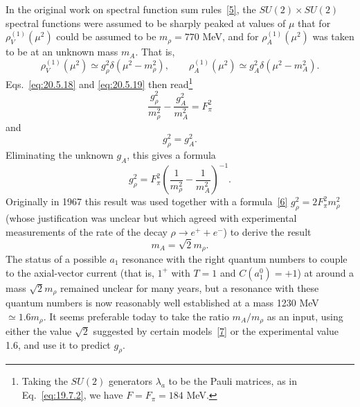 In the original work on spectral function sum rules~\hyperref[ch20-ref-5]{[5]}, the $SU(2)\times SU(2)$ spectral functions were assumed to be sharply peaked at values of $\mu$ that for $\rho_V^{(1)}(\mu^2)$ could be assumed to be $m_\rho=770$ MeV, and for $\rho_A^{(1)}(\mu^2)$ was taken to be at an unknown mass $m_A$. That is,
\[
\rho_V^{(1)}(\mu^2)\simeq g_\rho^2\delta(\mu^2-m_\rho^2),
\qquad
\rho_A^{(1)}(\mu^2)\simeq g_A^2\delta(\mu^2-m_A^2).
\]
Eqs.~\eqref{eq:20.5.18} and \eqref{eq:20.5.19} then read\footnote{Taking the $SU(2)$ generators $\lambda_a$ to be the Pauli matrices, as in Eq.~\eqref{eq:19.7.2}, we have $F=F_\pi=184$ MeV.}
\[
\frac{g_\rho^2}{m_\rho^2}-\frac{g_A^2}{m_A^2}=F_\pi^2
\]
and
\[
g_\rho^2=g_A^2.
\]
Eliminating the unknown $g_A$, this gives a formula
\[
g_\rho^2=F_\pi^2
\left(
\frac{1}{m_\rho^2}-\frac{1}{m_A^2}
\right)^{-1}.
\]
Originally in 1967 this result was used together with a formula~\hyperref[ch20-ref-6]{[6]} $g_\rho^2=2F_\pi^2m_\rho^2$ (whose justification was unclear but which agreed with experimental measurements of the rate of the decay $\rho\to e^++e^-$) to derive the result
\[
m_A=\sqrt{2}m_\rho.
\]
The status of a possible $a_1$ resonance with the right quantum numbers to couple to the axial-vector current (that is, $1^+$ with $T=1$ and $C(a_1^0)=+1$) at around a mass $\sqrt{2}m_\rho$ remained unclear for many years, but a resonance with these quantum numbers is now reasonably well established at a mass 1230 MeV $\simeq1.6m_\rho$. It seems preferable today to take the ratio $m_A/m_\rho$ as an input, using either the value $\sqrt{2}$ suggested by certain models~\hyperref[ch20-ref-7]{[7]} or the experimental value 1.6, and use it to predict $g_\rho$.

